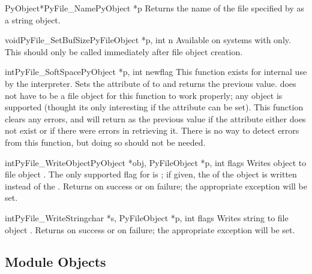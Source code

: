 \documentclass{manual}
\begin{document}
\begin{cfuncdesc}{PyObject*}{PyFile_Name}{PyObject *p}
Returns the name of the file specified by  as a string object.
\end{cfuncdesc}

\begin{cfuncdesc}{void}{PyFile_SetBufSize}{PyFileObject *p, int n}
Available on systems with 
only.  This should only be called immediately after file object
creation.
\end{cfuncdesc}

\begin{cfuncdesc}{int}{PyFile_SoftSpace}{PyObject *p, int newflag}
This function exists for internal use by the interpreter.
Sets the  attribute of  to  and
returns the
previous value.   does not have to be a file object
for this function to work properly; any object is supported (thought
its only interesting if the  attribute can be set).
This function clears any errors, and will return  as the
previous value if the attribute either does not exist or if there were
errors in retrieving it.  There is no way to detect errors from this
function, but doing so should not be needed.
\end{cfuncdesc}

\begin{cfuncdesc}{int}{PyFile_WriteObject}{PyObject *obj, PyFileObject *p,
                                           int flags}
Writes object  to file object .  The only supported
flag for  is ;
if given, the  of the object is written instead of the 
.  Returns  on success or  on
failure; the appropriate exception will be set.
\end{cfuncdesc}

\begin{cfuncdesc}{int}{PyFile_WriteString}{char *s, PyFileObject *p,
                                           int flags}
Writes string  to file object .  Returns  on
success or  on failure; the appropriate exception will be
set.
\end{cfuncdesc}


\subsection{Module Objects \label{moduleObjects}}
\end{document}
